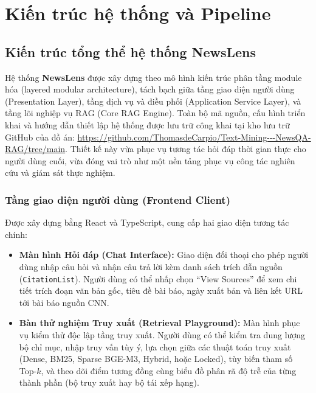 \section{Kiến trúc hệ thống và Pipeline}
\label{sec:system-pipeline}

\subsection{Kiến trúc tổng thể hệ thống NewsLens}

Hệ thống \textbf{NewsLens} được xây dựng theo mô hình kiến trúc phân tầng module hóa (layered modular architecture), tách bạch giữa tầng giao diện người dùng (Presentation Layer), tầng dịch vụ và điều phối (Application Service Layer), và tầng lõi nghiệp vụ RAG (Core RAG Engine). Toàn bộ mã nguồn, cấu hình triển khai và hướng dẫn thiết lập hệ thống được lưu trữ công khai tại kho lưu trữ GitHub của đồ án: \url{https://github.com/ThomasdeCarpio/Text-Mining---NewsQA-RAG/tree/main}. Thiết kế này vừa phục vụ tương tác hỏi đáp thời gian thực cho người dùng cuối, vừa đóng vai trò như một nền tảng phục vụ công tác nghiên cứu và giám sát thực nghiệm.

\subsubsection{Tầng giao diện người dùng (Frontend Client)}
Được xây dựng bằng React và TypeScript, cung cấp hai giao diện tương tác chính:
\begin{itemize}
  \item \textbf{Màn hình Hỏi đáp (Chat Interface):} Giao diện đối thoại cho phép người dùng nhập câu hỏi và nhận câu trả lời kèm danh sách trích dẫn nguồn (\texttt{CitationList}). Người dùng có thể nhấp chọn ``View Sources'' để xem chi tiết trích đoạn văn bản gốc, tiêu đề bài báo, ngày xuất bản và liên kết URL tới bài báo nguồn CNN.
  \item \textbf{Bàn thử nghiệm Truy xuất (Retrieval Playground):} Màn hình phục vụ kiểm thử độc lập tầng truy xuất. Người dùng có thể kiểm tra dung lượng bộ chỉ mục, nhập truy vấn tùy ý, lựa chọn giữa các thuật toán truy xuất (Dense, BM25, Sparse BGE-M3, Hybrid, hoặc Locked), tùy biến tham số Top-$k$, và theo dõi điểm tương đồng cùng biểu đồ phân rã độ trễ của từng thành phần (bộ truy xuất hay bộ tái xếp hạng).
\end{itemize}

